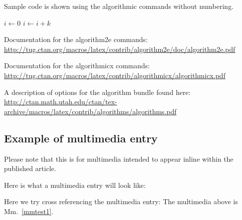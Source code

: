 \documentclass[reprint]{JASA}
\begin{document}
\begin{algorithm}[ht]
\caption{Sample code is shown using the algorithmic commands without
numbering.}
\begin{algorithmic}
    \STATE $i\gets 0$
\ELSE
        \STATE $i\gets i+k$
    \ENDIF
\ENDIF
\end{algorithmic}
\end{algorithm}


Documentation for the algorithm2e  commands:\\
\url{http://tug.ctan.org/macros/latex/contrib/algorithm2e/doc/algorithm2e.pdf}

Documentation for the algorithmicx  commands:\\
\url{http://tug.ctan.org/macros/latex/contrib/algorithmicx/algorithmicx.pdf}

A description of options for the algorithm bundle found here:\\
\url{http://ctan.math.utah.edu/ctan/tex-archive/macros/latex/contrib/algorithms/algorithms.pdf}


\subsection{Example of multimedia entry}
Please note that this is for multimedia intended to appear inline
within the published article. 

Here is what a multimedia entry will look like:
\label{mmtest1}

Here we try cross referencing the multimedia entry: The multimedia
above is Mm.~\ref{mmtest1}.
\end{document}

